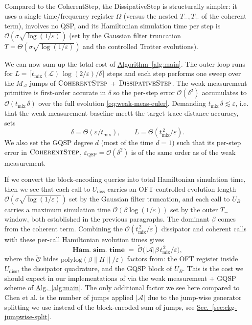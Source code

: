 Compared to the CoherentStep, the DissipativeStep is structurally simpler: it uses a single time/frequency register $\Omega$ (versus the nested $T_-, T_+$ of the coherent term), involves no QSP, and its Hamiltonian simulation time per step is $\mathcal{O}(\sigma\sqrt{\log(1/\varepsilon)})$ (set by the Gaussian filter truncation $T = \Theta(\sigma\sqrt{\log(1/\varepsilon)})$ and the controlled Trotter evolutions). 

We can now sum up the total cost of \hyperref[alg:main]{Algorithm~\ref*{alg:main}}. The outer loop runs for $L = \lceil t_\text{mix}(\mathcal{L})\,\log(2/\varepsilon)/\delta\rceil$ steps and each step performs one sweep over the $M_\mathcal{A}$ jumps of $\textsc{CoherentStep}$ + $\textsc{DissipativeStep}$. The weak measurement primitive is first-order accurate in $\delta$ so the per-step error $\mathcal{O}(\delta^2)$ accumulates to $\mathcal{O}(t_\text{mix}\,\delta)$ over the full evolution \eqref{eq:weak-meas-euler}. Demanding $t_\text{mix}\,\delta \lesssim \varepsilon$, i.e. that the weak measurement baseline meett the target trace distance accuracy, sets
$$
\delta = \Theta(\varepsilon/t_\text{mix}), 
\qquad
L = \Theta(t_\text{mix}^{\,2}/\varepsilon).
$$
We also set the GQSP degree $d$ (most of the time $d = 1$) such that its per-step error in $\textsc{CoherentStep}$, $\varepsilon_\mathrm{QSP} = \mathcal{O}(\delta^2)$ is of the same order as of the weak measurement.

If we convert the block-encoding queries into total Hamiltonian simulation time, then we see that each call to $U_\mathrm{diss}$ carries an OFT-controlled evolution length $\mathcal{O}(\sigma\sqrt{\log(1/\varepsilon)})$ set by the Gaussian filter truncation, and each call to $U_B$ carries a maximum simulation time $\mathcal{O}(\beta\log(1/\varepsilon))$ set by the outer $T_-$ window, both established in the previous paragraphs. The dominant $\beta$ comes from the coherent term.
Combining the $\mathcal{O}(t_\text{mix}^{\,2}/\varepsilon)$ dissipator and coherent calls with these per-call Hamiltonian evolution times gives
\begin{equation} \label{eq:ckg-cost}
    \textbf{Ham. sim. time} \;=\; \tilde{\mathcal{O}}\!\bigl(|\mathcal{A}|\beta\,t_\text{mix}^{\,2}/\varepsilon\bigr),
\end{equation}
where the $\tilde{\mathcal{O}}$ hides $\mathrm{polylog}(\beta\|H\|/\varepsilon)$ factors from: the OFT register inside $U_\mathrm{diss}$, the dissipator quadrature, and the GQSP block of $U_B$. This is the cost we should expect in our implementations of \cite[Theorem~III.1]{chen2023quantum} via the weak measurement + GQSP scheme of \hyperref[alg:main]{Alg.~\ref*{alg:main}}. The only additional factor we see here compared to Chen et al. is the number of jumps applied $|\mathcal{A}|$ due to the jump-wise generator splitting we use instead of the block-encoded sum of jumps, see \hyperref[sec:ckg-jumpwise-split]{Sec.~\ref*{sec:ckg-jumpwise-split}}. 


